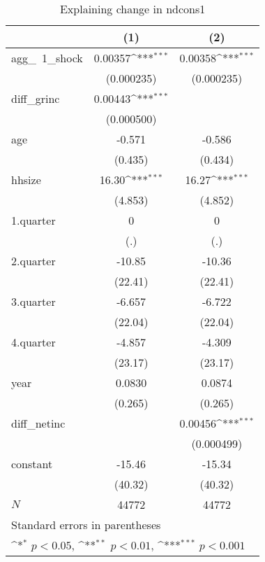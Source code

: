 \begin{table}[htbp]\centering
\def\sym#1{\ifmmode^{#1}\else\(^{#1}\)\fi}
\caption{\label{ndcons1\_deltacons} Explaining change in ndcons1}
\begin{tabular}{l*{2}{c}}
\hline\hline
            &\multicolumn{1}{c}{(1)}         &\multicolumn{1}{c}{(2)}         \\
\hline
agg\_~1\_shock&     0.00357\sym{***}&     0.00358\sym{***}\\
            &  (0.000235)         &  (0.000235)         \\
diff\_grinc  &     0.00443\sym{***}&                     \\
            &  (0.000500)         &                     \\
age         &      -0.571         &      -0.586         \\
            &     (0.435)         &     (0.434)         \\
hhsize      &       16.30\sym{***}&       16.27\sym{***}\\
            &     (4.853)         &     (4.852)         \\
1.quarter   &           0         &           0         \\
            &         (.)         &         (.)         \\
2.quarter   &      -10.85         &      -10.36         \\
            &     (22.41)         &     (22.41)         \\
3.quarter   &      -6.657         &      -6.722         \\
            &     (22.04)         &     (22.04)         \\
4.quarter   &      -4.857         &      -4.309         \\
            &     (23.17)         &     (23.17)         \\
year        &      0.0830         &      0.0874         \\
            &     (0.265)         &     (0.265)         \\
diff\_netinc &                     &     0.00456\sym{***}\\
            &                     &  (0.000499)         \\
constant    &      -15.46         &      -15.34         \\
            &     (40.32)         &     (40.32)         \\
\hline
\(N\)       &       44772         &       44772         \\
\hline\hline
\multicolumn{3}{l}{\footnotesize Standard errors in parentheses}\\
\multicolumn{3}{l}{\footnotesize \sym{*} \(p<0.05\), \sym{**} \(p<0.01\), \sym{***} \(p<0.001\)}\\
\end{tabular}
\end{table}
